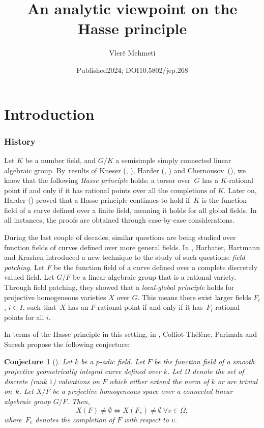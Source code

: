 \documentclass[10pt]{amsart}
\title[An analytic viewpoint on the Hasse principle]{An analytic viewpoint on the Hasse principle}
\author{Vlerë Mehmeti}
\date{Published2024; DOI10.5802/jep.268}
\newtheorem{conj}[thm]{Conjecture}
\theoremstyle{definition}
\begin{document}
\maketitle
\section*{Introduction}
\subsubsection*{History} Let $K$ be a number field, and $G/K$ a semisimple simply connected linear algebraic group. By~results of Kneser (\cite{kne1}, \cite{kne2}), Harder (\cite{harder1}, \cite{harder2}) and Chernousov~\mbox{(\cite{che})}, we know that the following \emph{Hasse principle} holds: a torsor over~$G$ has a $K$-rational point if and only if it has rational points over all the completions of $K$. Later on, Harder (\cite{harder3}) proved that a Hasse principle continues to hold if~$K$ is the function field of a curve defined over a finite field, meaning it holds for all global fields. In all instances, the proofs are obtained through case-by-case considerations.

During the last couple of decades, similar questions are being studied over function fields of curves defined over more general fields. In \cite{hhk}, Harbater, Hartmann and Krashen introduced a new technique to the study of such questions: \emph{field patching}. Let $F$ be the function field of a curve defined over a complete discretely valued field. Let $G/F$ be a linear algebraic group that is a rational variety.
Through field patching, they showed that a \emph{local-global principle} holds for projective homogeneous varieties $X$ over $G$. This means there exist larger fields $F_i$, $i \in I$, such that~$X$ has an $F$-rational point if and only if it has~$F_i$-rational points for all $i$.

In terms of the Hasse principle in this setting, in \cite{ctps}, Colliot-Thélène, Parimala and Suresh propose the following conjecture:

\begin{conj}[{\cite[Conj.\,1]{ctps}}] \label{conj1}
Let $k$ be a $p$-adic field. Let $F$ be the function field of a smooth projective geometrically integral curve defined over $k$. Let $\Omega$ denote the set of discrete (rank $1$) valuations on $F$ which either extend the norm of $k$ or are trivial on~$k$. Let $X/F$ be a projective homogeneous space over a connected linear algebraic group $G/F$. Then,
\[
X(F) \neq \emptyset \iff X(F_v) \neq \emptyset \ \forall v \in \Omega,
\]
where~$F_v$ denotes the completion of $F$ with respect to $v$.
\end{conj}
\end{document}
